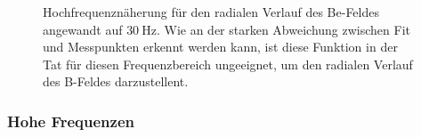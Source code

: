 \begin{figure}[h!]
    \resizebox{\textwidth}{!}{}
    \caption{%
        Hochfrequenzn\"aherung  f\"ur  den   radialen  Verlauf  des  Be-Feldes
        angewandt  auf   $\SI{30}{\hertz}$. Wie  an  der   starken  Abweichung
        zwischen Fit und  Messpunkten erkennt werden kann,  ist diese Funktion
        in der  Tat f\"ur diesen  Frequenzbereich ungeeignet, um  den radialen
        Verlauf des B-Feldes darzustellent.
    }
\end{figure}

\clearpage
\subsubsection{Hohe Frequenzen}
\label{sec:ausw:subsec:vollz:subsubsec:highfreq}

